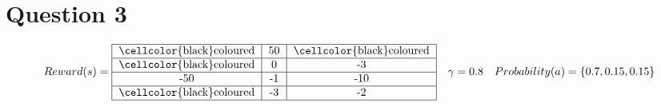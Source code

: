 \documentclass[letter, 10pt]{article}
\begin{document}
\section*{Question 3}
\begin{equation*}
    Reward(s) = \begin{tabular}{ |c|c|c| } 
                \hline
                \cellcolor{black}coloured & 50 & \cellcolor{black}coloured\\
                \hline
                \cellcolor{black}coloured & 0 & -3\\
                \hline
                -50 & -1 & -10\\
                \hline
                \cellcolor{black}coloured & -3 & -2\\
                \hline
                \end{tabular}\quad
    \gamma = 0.8\quad
    Probability(a) = \{0.7, 0.15, 0.15\}
\end{equation*}
\end{document}
